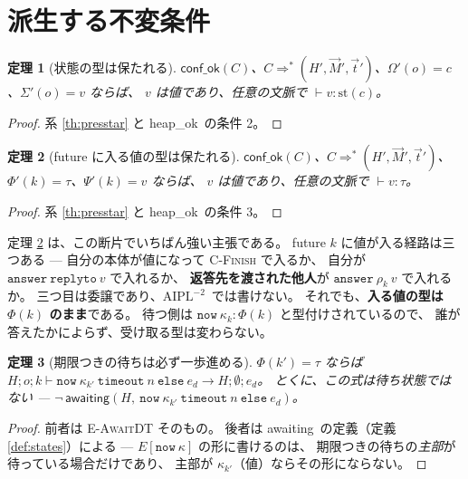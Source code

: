 \documentclass[11pt,a4paper]{ltjsarticle}
\newtheorem{theorem}{定理}
\theoremstyle{definition}
\theoremstyle{remark}
\newcommand{\Om}{\Omega}
\newcommand{\Sm}{\Sigma}
\newcommand{\Ph}{\Phi}
\newcommand{\Ps}{\Psi}
\newcommand{\styp}{\mathrm{st}}
\newcommand{\heapok}{\textsf{heap\_ok}}
\newcommand{\confok}{\textsf{conf\_ok}}
\newcommand{\awaiting}{\textsf{awaiting}}
\newcommand{\cstep}{\Longrightarrow}
\newcommand{\Atwo}{\ensuremath{\mathrm{AIPL}^{-2}}}
\begin{document}
\section{派生する不変条件}

\begin{theorem}[状態の型は保たれる]\label{th:stinv}
$\confok(C)$、$C \cstep^{*} (H',\vec{M}',\vec{t}')$、$\Om'(o) = c$、$\Sm'(o) = v$ ならば、
$v$ は値であり、任意の文脈で $\vdash v : \styp(c)$。
\end{theorem}

\begin{proof}
系 \ref{th:presstar} と \heapok\ の条件 2。
\end{proof}

\begin{theorem}[future に入る値の型は保たれる]\label{th:futinv}
$\confok(C)$、$C \cstep^{*} (H',\vec{M}',\vec{t}')$、$\Ph'(k) = \tau$、$\Ps'(k) = v$ ならば、
$v$ は値であり、任意の文脈で $\vdash v : \tau$。
\end{theorem}

\begin{proof}
系 \ref{th:presstar} と \heapok\ の条件 3。
\end{proof}

定理 \ref{th:futinv} は、この断片でいちばん強い主張である。
future $k$ に値が入る経路は三つある ---
自分の本体が値になって \textsc{C-Finish} で入るか、
自分が $\mathtt{answer}\ \mathtt{replyto}\ v$ で入れるか、
\textbf{返答先を渡された他人}が $\mathtt{answer}\ \rho_k\ v$ で入れるか。
三つ目は委譲であり、\Atwo\ では書けない。
それでも、\textbf{入る値の型は $\Ph(k)$ のまま}である。
待つ側は $\mathtt{now}\ \kappa_k : \Ph(k)$ と型付けされているので、
誰が答えたかによらず、受け取る型は変わらない。

\begin{theorem}[期限つきの待ちは必ず一歩進める]\label{th:timeout}
$\Ph(k') = \tau$ ならば
$H;o;k \vdash \mathtt{now}\ \kappa_{k'}\ \mathtt{timeout}\ n\ \mathtt{else}\ e_d
 \longrightarrow H; \emptyset; e_d$。
とくに、この式は待ち状態ではない ---
$\neg\,\awaiting(H,\ \mathtt{now}\ \kappa_{k'}\ \mathtt{timeout}\ n\ \mathtt{else}\ e_d)$。
\end{theorem}

\begin{proof}
前者は \textsc{E-AwaitDT} そのもの。
後者は \awaiting\ の定義（定義 \ref{def:states}）による ---
$E[\mathtt{now}\ \kappa]$ の形に書けるのは、
期限つきの待ちの\emph{主部}が待っている場合だけであり、
主部が $\kappa_{k'}$（値）ならその形にならない。
\end{proof}
\end{document}

